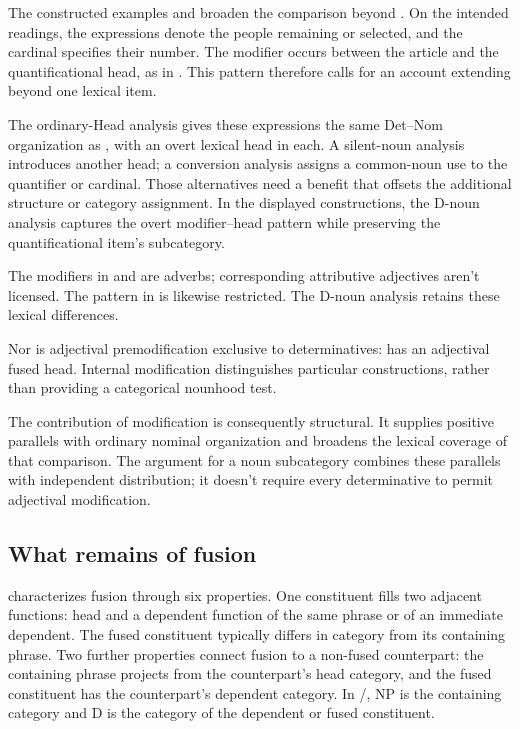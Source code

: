 \documentclass[12pt]{article}
\begin{document}
The constructed examples  and  broaden the comparison beyond . On the intended readings, the expressions denote the people remaining or selected, and the cardinal specifies their number. The modifier occurs between the article and the quantificational head, as in . This pattern therefore calls for an account extending beyond one lexical item.

The ordinary-Head analysis gives these expressions the same Det--Nom organization as , with an overt lexical head in each. A silent-noun analysis introduces another head; a conversion analysis assigns a common-noun use to the quantifier or cardinal. Those alternatives need a benefit that offsets the additional structure or category assignment. In the displayed constructions, the D-noun analysis captures the overt modifier--head pattern while preserving the quantificational item's subcategory.

The modifiers in  and  are adverbs; corresponding attributive adjectives aren't licensed. The pattern in  is likewise restricted. The D-noun analysis retains these lexical differences.

Nor is adjectival premodification exclusive to determinatives:  has an adjectival fused head. Internal modification distinguishes particular constructions, rather than providing a categorical nounhood test.

The contribution of modification is consequently structural. It supplies positive parallels with ordinary nominal organization and broadens the lexical coverage of that comparison. The argument for a noun subcategory combines these parallels with independent distribution; it doesn't require every determinative to permit adjectival modification.

\subsection{What remains of fusion}

\textcite{Payne2007} characterizes fusion through six properties. One constituent fills two adjacent functions: head and a dependent function of the same phrase or of an immediate dependent. The fused constituent typically differs in category from its containing phrase. Two further properties connect fusion to a non-fused counterpart: the containing phrase projects from the counterpart's head category, and the fused constituent has the counterpart's dependent category. In /, NP is the containing category and D is the category of the dependent or fused constituent.
\end{document}
